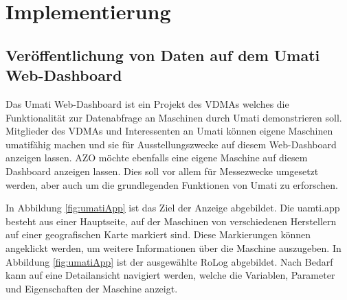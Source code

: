 \documentclass[a4paper, 12pt, oneside, toc=listofnumbered, bibliography=totoc]{scrbook}
\begin{document}
	
		
	
\chapter{Implementierung}\label{ch:Implementierung}
	
	\section{Veröffentlichung von Daten auf dem Umati Web-Dashboard}\label{ch:Implementierung-Web}
		
		Das Umati Web-Dashboard ist ein Projekt des VDMAs welches die Funktionalität zur Datenabfrage an Maschinen durch Umati demonstrieren soll. Mitglieder des VDMAs und Interessenten an Umati können eigene Maschinen umatifähig machen und sie für Ausstellungszwecke auf diesem Web-Dashboard anzeigen lassen. AZO möchte ebenfalls eine eigene Maschine auf diesem Dashboard anzeigen lassen. Dies soll vor allem für Messezwecke umgesetzt werden, aber auch um die grundlegenden Funktionen von Umati zu erforschen.
		
		In Abbildung \ref{fig:umatiApp} ist das Ziel der Anzeige abgebildet. Die uamti.app besteht aus einer Hauptseite, auf der Maschinen von verschiedenen Herstellern auf einer geografischen Karte markiert sind. Diese Markierungen können angeklickt werden, um weitere Informationen über die Maschine auszugeben. In Abbildung \ref{fig:umatiApp} ist der ausgewählte RoLog abgebildet. Nach Bedarf kann auf eine Detailansicht navigiert werden, welche die Variablen, Parameter und Eigenschaften der Maschine anzeigt.
		
\end{document}
